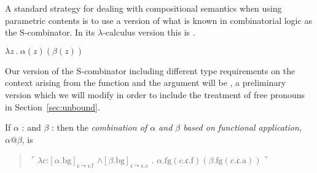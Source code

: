 A standard strategy for dealing with compositional semantics when
using parametric contents is to use a version of what is known in
combinatorial logic as the S-combinator.  In its $\lambda$-calculus
version this is \nexteg{}.
\begin{ex} 
$\lambda z\ .\ \alpha(z)(\beta(z))$ 
\end{ex} 
Our version of the S-combinator including different type requirements
on the context arising from the function and the argument will be
\nexteg{}, a preliminary version which we will modify in order to
include the treatment of free pronouns in Section~\ref{sec:unbound}.
\begin{ex}
If $\alpha$ :  
and $\beta$ : 
                         then the \textit{combination of $\alpha$ and
    $\beta$  based on functional application}, $\alpha\text{@}\beta$, is
\begin{quote}
  $\ulcorner\lambda c$:$[\alpha.\text{bg}]_{\mathfrak{c}\leadsto\mathfrak{c}.\text{f}}$
      \d{$\wedge$}$[\beta.\text{bg}]_{\mathfrak{c}\leadsto\mathfrak{c}.\text{a}}$
  . $\alpha.\text{fg}(c.\mathfrak{c}.\text{f})(\beta.\text{fg}(c.\mathfrak{c}.\text{a}))\urcorner$
\end{quote}
\end{ex}

